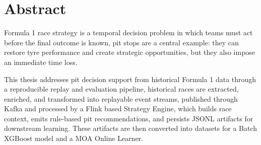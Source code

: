 \documentclass{Configuration_Files/PoliMi3i_thesis}
\begin{document}


\pagestyle{empty} %
\frontmatter %



\startpreamble
\setcounter{page}{1} %

\chapter{Abstract}

Formula 1 race strategy is a temporal decision problem in which teams must act before the final outcome is known, pit stops are a central example:
they can restore tyre performance and create strategic opportunities, but they also impose an immediate time loss.

This thesis addresses pit decision support from historical Formula 1 data through a reproducible replay and evaluation pipeline, historical races
are extracted, enriched, and transformed into replayable event streams, published through Kafka and processed by a Flink based Strategy Engine,
which builds race context, emits rule-based pit recommendations, and persists JSONL artifacts for downstream learning. These artifacts are then converted
into datasets for a Batch XGBoost model and a MOA Online Learner.
\end{document}
